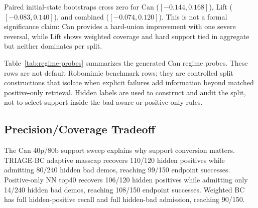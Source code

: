 \documentclass{article}
\newcommand{\method}{TRIAGE-BC}
\begin{document}
Paired initial-state bootstraps cross zero for Can ($[-0.144,0.168]$), Lift ($[-0.083,0.140]$), and combined ($[-0.074,0.120]$). This is not a formal significance claim: Can provides a hard-union improvement with one severe reversal, while Lift shows weighted coverage and hard support tied in aggregate but neither dominates per split.

Table~\ref{tab:regime-probes} summarizes the generated Can regime probes. These rows are not default Robomimic benchmark rows; they are controlled split constructions that isolate when explicit failures add information beyond matched positive-only retrieval. Hidden labels are used to construct and audit the split, not to select support inside the bad-aware or positive-only rules.

\begin{table}[t]
  \centering
  \scriptsize
  \setlength{\tabcolsep}{3pt}
  \caption{Generated Can regime-probe summary. Counts are 50 endpoint rollouts per split over seeds 101/202/303; support entries are selected hidden-positive/hidden-bad demos for bad-aware versus matched positive-only retrieval.}
  \label{tab:regime-probes}
\end{table}

\subsection{Precision/Coverage Tradeoff}

The Can 40p/80b support sweep explains why support conversion matters. \method{} adaptive masscap recovers 110/120 hidden positives while admitting 80/240 hidden bad demos, reaching 99/150 endpoint successes. Positive-only NN top40 recovers 106/120 hidden positives while admitting only 14/240 hidden bad demos, reaching 108/150 endpoint successes. Weighted BC has full hidden-positive recall and full hidden-bad admission, reaching 90/150.
\end{document}
